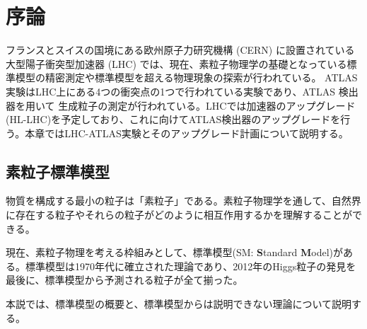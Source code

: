 \chapter{序論}
\label{sec:josho}

フランスとスイスの国境にある欧州原子力研究機構 (CERN) に設置されている大型陽子衝突型加速器 (LHC) では、現在、素粒子物理学の基礎となっている標準模型の精密測定や標準模型を超える物理現象の探索が行われている。 ATLAS実験はLHC上にある4つの衝突点の1つで行われている実験であり、ATLAS 検出器を用いて 生成粒子の測定が行われている。LHCでは加速器のアップグレード(HL-LHC)を予定しており、これに向けてATLAS検出器のアップグレードを行う。本章ではLHC-ATLAS実験とそのアップグレード計画について説明する。



\section{素粒子標準模型}
\label{sec:soryuushi}
物質を構成する最小の粒子は「素粒子」である。素粒子物理学を通して、自然界に存在する粒子やそれらの粒子がどのように相互作用するかを理解することができる。

現在、素粒子物理を考える枠組みとして、標準模型(SM: \textbf{S}tandard \textbf{M}odel)がある。標準模型は1970年代に確立された理論であり、2012年のHiggs粒子の発見を最後に、標準模型から予測される粒子が全て揃った。

本説では、標準模型の概要と、標準模型からは説明できない理論について説明する。


